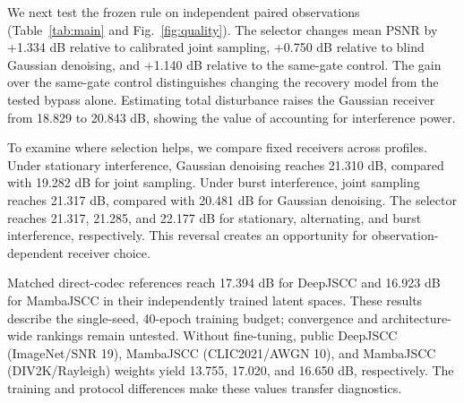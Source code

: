 We next test the frozen rule on independent paired observations (Table~\ref{tab:main} and Fig.~\ref{fig:quality}). The selector changes mean PSNR by +1.334 dB relative to calibrated joint sampling, +0.750 dB relative to blind Gaussian denoising, and +1.140 dB relative to the same-gate control. The gain over the same-gate control distinguishes changing the recovery model from the tested bypass alone. Estimating total disturbance raises the Gaussian receiver from 18.829 to 20.843 dB, showing the value of accounting for interference power.

To examine where selection helps, we compare fixed receivers across profiles. Under stationary interference, Gaussian denoising reaches 21.310 dB, compared with 19.282 dB for joint sampling. Under burst interference, joint sampling reaches 21.317 dB, compared with 20.481 dB for Gaussian denoising. The selector reaches 21.317, 21.285, and 22.177 dB for stationary, alternating, and burst interference, respectively. This reversal creates an opportunity for observation-dependent receiver choice.

Matched direct-codec references reach 17.394 dB for DeepJSCC and 16.923 dB for MambaJSCC in their independently trained latent spaces. These results describe the single-seed, 40-epoch training budget; convergence and architecture-wide rankings remain untested. Without fine-tuning, public DeepJSCC (ImageNet/SNR 19), MambaJSCC (CLIC2021/AWGN 10), and MambaJSCC (DIV2K/Rayleigh) weights yield 13.755, 17.020, and 16.650 dB, respectively. The training and protocol differences make these values transfer diagnostics.
